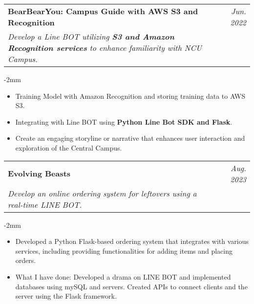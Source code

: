 \documentclass[a4paper,11pt]{article}
\makeatletter
\newcommand{\resumeProject}[4]{
\vspace{0.5mm}\item
    \begin{tabular*}{0.98\textwidth}[t]{l@{\extracolsep{\fill}}r}
        \textbf{#1} & \textit{\footnotesize{#3}} \\
        \footnotesize{\textit{#2}} & \footnotesize{#4}
    \end{tabular*}
    \vspace{-2.4mm}
}
\newcommand{\resumeItemListStart}{\begin{justify}\begin{itemize}[leftmargin=3ex, rightmargin=2ex, noitemsep,labelsep=1.2mm,itemsep=0mm]\small}
\newcommand{\resumeItemListEnd}{\end{itemize}\end{justify}\vspace{-2mm}}
\makeatother
\begin{document}
        \resumeProject
            { BearBearYou: Campus Guide with AWS S3 and Recognition \hspace{0.5em} \href{https://github.com/1chooo/bear-bear}{\faGithub} \hspace{0.2em} \href{https://www.youtube.com/watch?v=S0HZJIqVThI}{\faDesktop}} %
            {Develop a Line BOT utilizing \textbf{S3 and Amazon Recognition services} to enhance familiarity with NCU Campus.} %
            {Jun. 2022} %
    
            \vspace{-2mm}
    
            \resumeItemListStart
                \item {Training Model with Amazon Recognition and storing training data to AWS S3.}
                \item {Integrating with Line BOT using \textbf{Python Line Bot SDK and Flask}.}
                \item {Create an engaging storyline or narrative that enhances user interaction and exploration of the Central Campus.}
            \resumeItemListEnd
        
    
        \resumeProject
            { Evolving Beasts \hspace{0.5em} \href{https://github.com/1chooo/feather-feast}{\faGithub} \hspace{0.2em} \href{https://www.youtube.com/watch?v=S0HZJIqVThI}{\faDesktop}} %
            {Develop an online ordering system for leftovers using a real-time LINE BOT.} %
            {Aug. 2023} %
            
            \vspace{-2mm}
            
            \resumeItemListStart
                \item {Developed a Python Flask-based ordering system that integrates with various services, including providing functionalities for adding items and placing orders.}
                \item {What I have done: Developed a drama on LINE BOT and implemented databases using mySQL and servers. Created APIs to connect clients and the server using the Flask framework.}
            \resumeItemListEnd
            
        \vspace{-3mm}
    
\end{document}
